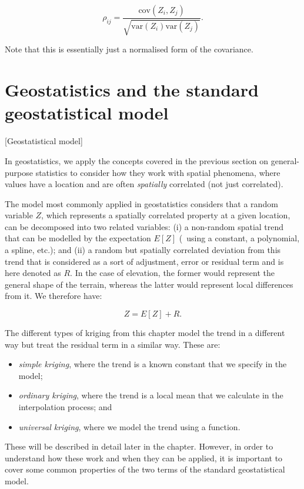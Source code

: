 \begin{equation}
\rho_{ij}=\frac{\mathrm{cov}(Z_i, Z_j)}{\sqrt{\mathrm{var}(Z_i) \mathrm{var}(Z_j)}}. \nonumber
\end{equation}

Note that this is essentially just a normalised form of the covariance.

\section{Geostatistics and the standard geostatistical model}[Geostatistical model]

In geostatistics, we apply the concepts covered in the previous section on general-purpose statistics to consider how they work with spatial phenomena, where values have a location and are often \emph{spatially} correlated (not just correlated).

The model most commonly applied in geostatistics considers that a random variable \(Z\), which represents a spatially correlated property at a given location, can be decomposed into two related variables: (i) a non-random spatial trend that can be modelled by the expectation \(E[Z]\) (\eg\ using a constant, a polynomial, a spline, etc.); and (ii) a random but spatially correlated deviation from this trend that is considered as a sort of adjustment, error or residual term and is here denoted as \(R\).
In the case of elevation, the former would represent the general shape of the terrain, whereas the latter would represent local differences from it.
We therefore have:

\begin{equation}
\label{eq:geostat}
Z = E\left[Z\right] + R.
\end{equation}

The different types of kriging from this chapter model the trend in a different way but treat the residual term in a similar way.
These are:
\begin{itemize}
\item \emph{simple kriging}, where the trend is a known constant that we specify in the model;
\item \emph{ordinary kriging}, where the trend is a local mean that we calculate in the interpolation process; and
\item \emph{universal kriging}, where we model the trend using a function.
\end{itemize}

These will be described in detail later in the chapter.
However, in order to understand how these work and when they can be applied, it is important to cover some common properties of the two terms of the standard geostatistical model.

